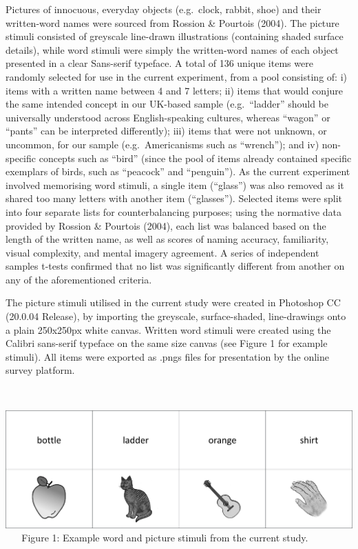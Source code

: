 \documentclass[
  11pt,
]{article}
\begin{document}
Pictures of innocuous, everyday objects (e.g.~clock, rabbit, shoe) and
their written-word names were sourced from Rossion \& Pourtois (2004).
The picture stimuli consisted of greyscale line-drawn illustrations
(containing shaded surface details), while word stimuli were simply the
written-word names of each object presented in a clear Sans-serif
typeface. A total of 136 unique items were randomly selected for use in
the current experiment, from a pool consisting of: i) items with a
written name between 4 and 7 letters; ii) items that would conjure the
same intended concept in our UK-based sample (e.g.~``ladder'' should be
universally understood across English-speaking cultures, whereas
``wagon'' or ``pants'' can be interpreted differently); iii) items that
were not unknown, or uncommon, for our sample (e.g.~Americanisms such as
``wrench''); and iv) non-specific concepts such as ``bird'' (since the
pool of items already contained specific exemplars of birds, such as
``peacock'' and ``penguin''). As the current experiment involved
memorising word stimuli, a single item (``glass'') was also removed as
it shared too many letters with another item (``glasses''). Selected
items were split into four separate lists for counterbalancing purposes;
using the normative data provided by Rossion \& Pourtois (2004), each
list was balanced based on the length of the written name, as well as
scores of naming accuracy, familiarity, visual complexity, and mental
imagery agreement. A series of independent samples t-tests confirmed
that no list was significantly different from another on any of the
aforementioned criteria.

The picture stimuli utilised in the current study were created in
Photoshop CC (20.0.04 Release), by importing the greyscale,
surface-shaded, line-drawings onto a plain 250x250px white canvas.
Written word stimuli were created using the Calibri sans-serif typeface
on the same size canvas (see Figure 1 for example stimuli). All items
were exported as .pngs files for presentation by the online survey
platform.

~ ~

\includegraphics[width=1\linewidth]{./resources/images/exp1__stim_examples}
~ ~ Figure 1: Example word and picture stimuli from the current study. ~
~
\end{document}
